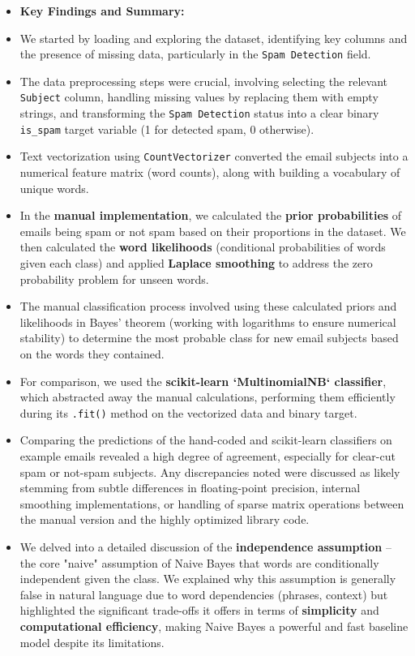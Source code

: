 \documentclass[12pt,a4paper]{article}
\begin{document}
\begin{itemize}
    \item \textbf{Key Findings and Summary:}
    \item We started by loading and exploring the dataset, identifying key columns and the presence of missing data, particularly in the \texttt{Spam Detection} field.
    \item The data preprocessing steps were crucial, involving selecting the relevant \texttt{Subject} column, handling missing values by replacing them with empty strings, and transforming the \texttt{Spam Detection} status into a clear binary \texttt{is\_spam} target variable (1 for detected spam, 0 otherwise).
    \item Text vectorization using \texttt{CountVectorizer} converted the email subjects into a numerical feature matrix (word counts), along with building a vocabulary of unique words.
    \item In the \textbf{manual implementation}, we calculated the \textbf{prior probabilities} of emails being spam or not spam based on their proportions in the dataset. We then calculated the \textbf{word likelihoods} (conditional probabilities of words given each class) and applied \textbf{Laplace smoothing} to address the zero probability problem for unseen words.
    \item The manual classification process involved using these calculated priors and likelihoods in Bayes' theorem (working with logarithms to ensure numerical stability) to determine the most probable class for new email subjects based on the words they contained.
    \item For comparison, we used the \textbf{scikit-learn `MultinomialNB` classifier}, which abstracted away the manual calculations, performing them efficiently during its \texttt{.fit()} method on the vectorized data and binary target.
    \item Comparing the predictions of the hand-coded and scikit-learn classifiers on example emails revealed a high degree of agreement, especially for clear-cut spam or not-spam subjects. Any discrepancies noted were discussed as likely stemming from subtle differences in floating-point precision, internal smoothing implementations, or handling of sparse matrix operations between the manual version and the highly optimized library code.
    \item We delved into a detailed discussion of the \textbf{independence assumption} – the core "naive" assumption of Naive Bayes that words are conditionally independent given the class. We explained why this assumption is generally false in natural language due to word dependencies (phrases, context) but highlighted the significant trade-offs it offers in terms of \textbf{simplicity} and \textbf{computational efficiency}, making Naive Bayes a powerful and fast baseline model despite its limitations.

\end{itemize}
\end{document}
